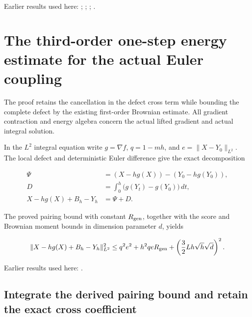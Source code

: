 \documentclass[11pt,a4paper]{report}
\begin{document}
Earlier results used here: \cite[Section~3.13.2]{LangevinLean2026ULASC}; \cite[Section~3.13.3]{LangevinLean2026ULASC}; \cite[Section~3.13.9]{LangevinLean2026ULASC}; \cite[Section~3.26.3]{LangevinLean2026ULASC}.
\section{\texorpdfstring{The third-order one-step energy estimate for the actual Euler coupling}{The third-order one-step energy estimate for the actual Euler coupling}}
\label{proof-module-AverageLMC-LaplacianOneStep-lean}


The proof retains the cancellation in the defect cross term while bounding the complete defect by the existing first-order Brownian estimate. All gradient contraction and energy algebra concern the actual lifted gradient and actual integral solution.



In the \(L^2\) integral equation write \(g=\nabla f\), \(q=1-mh\), and \(e=\|X-Y_0\|_{L^2}\). The local defect and deterministic Euler difference give the exact decomposition


\[\begin{aligned}\Psi&=(X-hg(X))-(Y_0-hg(Y_0)),\\D&=\int_0^h\bigl(g(Y_t)-g(Y_0)\bigr)\,dt,\\X-hg(X)+B_h-Y_h&=\Psi+D.\end{aligned}\]


The proved pairing bound with constant \(R_{\rm gen}\), together with the score and Brownian moment bounds in dimension parameter \(d\), yields


\[\|X-hg(X)+B_h-Y_h\|_{L^2}^{2}\le q^2e^2+h^2qeR_{\rm gen}+\left(\frac32Lh\sqrt h\sqrt d\right)^2.\]

Earlier results used here: \cite[Section~3.13]{LangevinLean2026ULASC}.
\subsection{\texorpdfstring{Integrate the derived pairing bound and retain the exact cross coefficient}{Integrate the derived pairing bound and retain the exact cross coefficient}}
\label{report-step-AverageLMC-LaplacianOneStep-lean-1}
\end{document}
